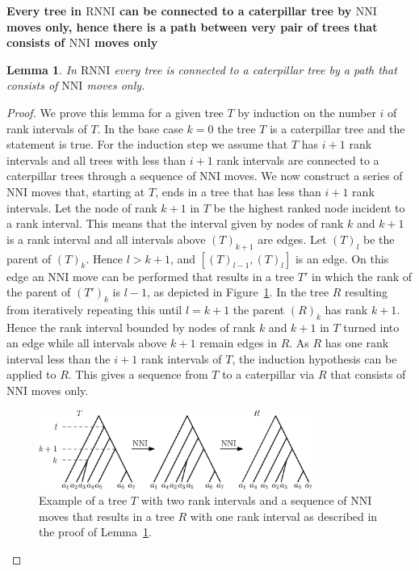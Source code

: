 \documentclass[11pt]{amsart}
\newtheorem{lemma}{Lemma}
\newcommand{\rnni}{\mathrm{RNNI}}
\newcommand{\nni}{\mathrm{NNI}}
\newcommand{\summary}[1]{\textbf{#1}} %
\begin{document}
\summary{Every tree in $\rnni$ can be connected to a caterpillar tree by $\nni$ moves only, hence there is a path between very pair of trees that consists of $\nni$ moves only}
\begin{lemma}
	In $\rnni$ every tree is connected to a caterpillar tree by a path that consists of $\nni$ moves only.
	\label{lemma:nni_path_to_caterpillar}
\end{lemma}

\begin{proof}
	We prove this lemma for a given tree $T$ by induction on the number $i$ of rank intervals of $T$.
	In the base case $k = 0$ the tree $T$ is a caterpillar tree and the statement is true.
	For the induction step we assume that $T$ has $i+1$ rank intervals and all trees with less than $i+1$ rank intervals are connected to a caterpillar trees through a sequence of $\nni$ moves.
	We now construct a series of $\nni$ moves that, starting at $T$, ends in a tree that has less than $i+1$ rank intervals.
	Let the node of rank $k+1$ in $T$ be the highest ranked node incident to a rank interval.
	This means that the interval given by nodes of rank $k$ and $k+1$ is a rank interval and all intervals above $(T)_{k+1}$ are edges.
	Let $(T)_l$ be the parent of $(T)_k$.
	Hence $l > k+1$, and $[(T)_{l-1}, (T)_{l}]$ is an edge.
	On this edge an $\nni$ move can be performed that results in a tree $T'$ in which the rank of the parent of $(T')_k$ is $l-1$, as depicted in Figure~\ref{fig:nni_path_caterpillar}.
	In the tree $R$ resulting from iteratively repeating this until $l = k+1$ the parent $(R)_k$ has rank $k+1$.
	Hence the rank interval bounded by nodes of rank $k$ and $k+1$ in $T$ turned into an edge while all intervals above $k+1$ remain edges in $R$.
	As $R$ has one rank interval less than the $i+1$ rank intervals of $T$, the induction hypothesis can be applied to $R$.
	This gives a sequence from $T$ to a caterpillar via $R$ that consists of $\nni$ moves only.
	\begin{figure}[ht]
		\includegraphics[width=0.8\textwidth]{nni_path_caterpillar.eps}
		\caption{Example of a tree $T$ with two rank intervals and a sequence of $\nni$ moves that results in a tree $R$ with one rank interval as described in the proof of Lemma~\ref{lemma:nni_path_to_caterpillar}.}
		\label{fig:nni_path_caterpillar}
	\end{figure}
\end{proof}
\end{document}

